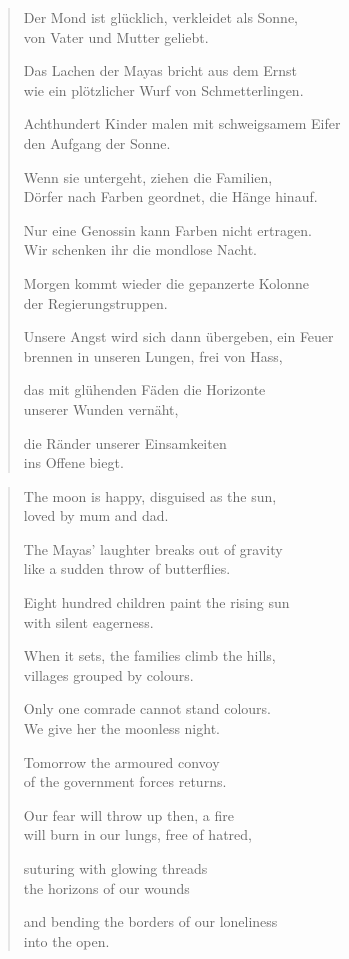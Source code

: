
\cleartoverso


\begin{verse}

Der Mond ist glücklich, verkleidet als Sonne,\\
von Vater und Mutter geliebt.

Das Lachen der Mayas bricht aus dem Ernst\\
wie ein plötzlicher Wurf von Schmetterlingen.

Achthundert Kinder malen mit schweigsamem Eifer\\
den Aufgang der Sonne.

Wenn sie untergeht, ziehen die Familien,\\
Dörfer nach Farben geordnet, die Hänge hinauf.

Nur eine Genossin kann Farben nicht ertragen.\\
Wir schenken ihr die mondlose Nacht.

Morgen kommt wieder die gepanzerte Kolonne\\
der Regierungstruppen.

Unsere Angst wird sich dann übergeben, ein Feuer\\
brennen in unseren Lungen, frei von Hass,

das mit glühenden Fäden die Horizonte\\
unserer Wunden vernäht,

die Ränder unserer Einsamkeiten\\
ins Offene biegt.

\end{verse}

\clearpage


\begin{verse}

The moon is happy, disguised as the sun,\\
loved by mum and dad.

The Mayas' laughter breaks out of gravity\\
like a sudden throw of butterflies.

Eight hundred children paint the rising sun\\
with silent eagerness.

When it sets, the families climb the hills,\\
villages grouped by colours.

Only one comrade cannot stand colours.\\
We give her the moonless night.

Tomorrow the armoured convoy\\
of the government forces returns.

Our fear will throw up then, a fire\\
will burn in our lungs, free of hatred,

suturing with glowing threads\\
the horizons of our wounds

and bending the borders of our loneliness\\
into the open.

\end{verse}
